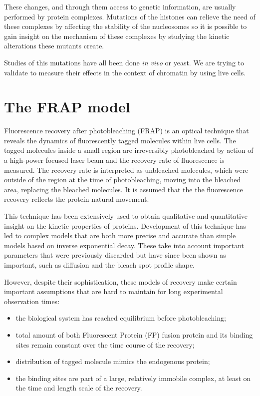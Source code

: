 These changes, and through them access to genetic information, are usually performed
by protein complexes. Mutations of the histones can relieve the need of these complexes
by affecting the stability of the nucleosomes so it is possible to gain insight on
the mechanism of these complexes by studying the kinetic alterations these mutants create.

Studies of this mutations have all been done \textit{in vivo} or yeast. We are trying
to validate to measure their effects in the context of chromatin by using live cells.

\section{The FRAP model}

  Fluorescence recovery after photobleaching (FRAP) is an optical technique
  that reveals the dynamics of fluorescently tagged molecules within live cells.
  The tagged molecules inside a small region are irreversibly photobleached by
  action of a high-power focused laser beam and the recovery rate of fluorescence
  is measured. The recovery rate is interpreted as unbleached molecules,
  which were outside of the region at the time of photobleaching, moving into
  the bleached area, replacing the bleached molecules. It is assumed that the
  the fluorescence recovery reflects the protein natural movement.

  This technique has been extensively used to obtain qualitative and quantitative
  insight on the kinetic properties of proteins. Development of this technique has
  led to complex models that are both more precise and accurate than simple models
  based on inverse exponential decay. These take into account important parameters
  that were previously discarded but have since been shown as important, such
  as diffusion and the bleach spot profile shape.

  However, despite their sophistication, these models of recovery make certain important
  assumptions that are hard to maintain for long experimental observation times:

  \begin{itemize}
    \item the biological system has reached equilibrium before photobleaching;
    \item total amount of both Fluorescent Protein (FP) fusion protein and its
          binding sites remain constant over the time course of the recovery;
    \item distribution of tagged molecule mimics the endogenous protein;
    \item the binding sites are part of a large, relatively immobile complex, at
          least on the time and length scale of the recovery.
  \end{itemize}

